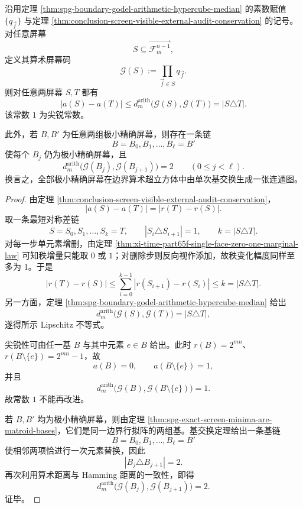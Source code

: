 \begin{theorem}\label{thm:conclusion-screen-audit-gap-arithmetic-lipschitz}
沿用定理 \ref{thm:spg-boundary-godel-arithmetic-hypercube-median} 的素数赋值 \(\{q_{\vec f}\}\) 与定理 \ref{thm:conclusion-screen-visible-external-audit-conservation} 的记号。对任意屏幕
\[
S\subseteq \overrightarrow{\mathcal F_m^{n-1}},
\]
定义其算术屏幕码
\[
\mathcal G(S):=\prod_{\vec f\in S}q_{\vec f}.
\]
则对任意两屏幕 \(S,T\) 都有
\[
|a(S)-a(T)|
\le
d_m^{\mathrm{arith}}\bigl(\mathcal G(S),\mathcal G(T)\bigr)
=
|S\triangle T|.
\]
该常数 \(1\) 为尖锐常数。

此外，若 \(B,B'\) 为任意两组极小精确屏幕，则存在一条链
\[
B=B_0,B_1,\dots,B_\ell=B'
\]
使每个 \(B_j\) 仍为极小精确屏幕，且
\[
d_m^{\mathrm{arith}}\bigl(\mathcal G(B_j),\mathcal G(B_{j+1})\bigr)=2
\qquad(0\le j<\ell).
\]
换言之，全部极小精确屏幕在边界算术超立方体中由单次基交换生成一张连通图。
\end{theorem}
\begin{proof}
由定理 \ref{thm:conclusion-screen-visible-external-audit-conservation}，
\[
|a(S)-a(T)|=|r(T)-r(S)|.
\]
取一条最短对称差链
\[
S=S_0,S_1,\dots,S_k=T,
\qquad
|S_i\triangle S_{i+1}|=1,
\qquad
k=|S\triangle T|.
\]
对每一步单元素增删，由定理 \ref{thm:xi-time-part65f-single-face-zero-one-marginal-law} 可知秩增量只能取 \(0\) 或 \(1\)；对删除步则反向视作添加，故秩变化幅度同样至多为 \(1\)。于是
\[
|r(T)-r(S)|
\le
\sum_{i=0}^{k-1}|r(S_{i+1})-r(S_i)|
\le
k
=
|S\triangle T|.
\]
另一方面，定理 \ref{thm:spg-boundary-godel-arithmetic-hypercube-median} 给出
\[
d_m^{\mathrm{arith}}\bigl(\mathcal G(S),\mathcal G(T)\bigr)=|S\triangle T|,
\]
遂得所示 Lipschitz 不等式。

尖锐性可由任一基 \(B\) 与其中元素 \(e\in B\) 给出。此时 \(r(B)=2^{mn}\)、\(r(B\setminus\{e\})=2^{mn}-1\)，故
\[
a(B)=0,
\qquad
a(B\setminus\{e\})=1,
\]
并且
\[
d_m^{\mathrm{arith}}\bigl(\mathcal G(B),\mathcal G(B\setminus\{e\})\bigr)=1.
\]
故常数 \(1\) 不能再改进。

若 \(B,B'\) 均为极小精确屏幕，则由定理 \ref{thm:spg-exact-screen-minima-are-matroid-bases}，它们是同一边界行拟阵的两组基。基交换定理给出一条基链
\[
B=B_0,B_1,\dots,B_\ell=B'
\]
使相邻两项恰进行一次元素替换，因此
\[
|B_j\triangle B_{j+1}|=2.
\]
再次利用算术距离与 Hamming 距离的一致性，即得
\[
d_m^{\mathrm{arith}}\bigl(\mathcal G(B_j),\mathcal G(B_{j+1})\bigr)=2.
\]
证毕。
\end{proof}

